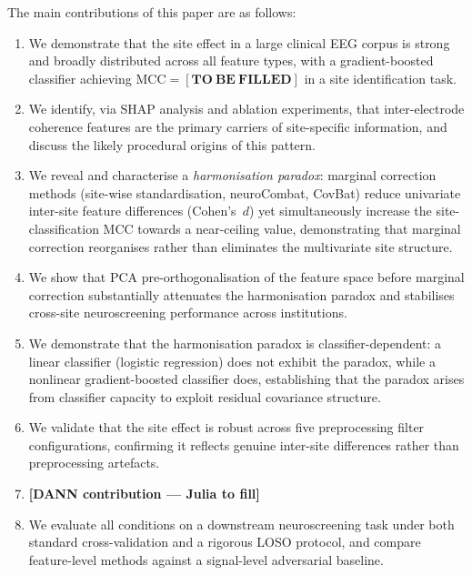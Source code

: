 \documentclass[preprint,12pt]{elsarticle}
\begin{document}
The main contributions of this paper are as follows:
\begin{enumerate}
  \item We demonstrate that the site effect in a large clinical EEG
        corpus is strong and broadly distributed across all feature
        types, with a gradient-boosted classifier achieving
        $\mathrm{MCC} = \mathbf{[TO\ BE\ FILLED]}$ in a site
        identification task.
  \item We identify, via SHAP analysis and ablation experiments,
        that inter-electrode coherence features are the primary
        carriers of site-specific information, and discuss the likely
        procedural origins of this pattern.
  \item We reveal and characterise a \emph{harmonisation paradox}:
        marginal correction methods (site-wise standardisation,
        neuroCombat, CovBat) reduce univariate inter-site feature
        differences (Cohen's~$d$) yet simultaneously increase the
        site-classification MCC towards a near-ceiling value,
        demonstrating that marginal correction reorganises rather
        than eliminates the multivariate site structure.
  \item We show that PCA pre-orthogonalisation of the feature space
        before marginal correction substantially attenuates the
        harmonisation paradox and stabilises cross-site neuroscreening
        performance across institutions.
  \item We demonstrate that the harmonisation paradox is
        classifier-dependent: a linear classifier (logistic regression)
        does not exhibit the paradox, while a nonlinear gradient-boosted
        classifier does, establishing that the paradox arises from
        classifier capacity to exploit residual covariance structure.
  \item We validate that the site effect is robust across five
        preprocessing filter configurations, confirming it reflects
        genuine inter-site differences rather than preprocessing
        artefacts.
  \item \textbf{[DANN contribution --- Julia to fill]}
  \item We evaluate all conditions on a downstream neuroscreening
        task under both standard cross-validation and a rigorous
        LOSO protocol, and compare feature-level methods against a
        signal-level adversarial baseline.
\end{enumerate}

\end{document}
